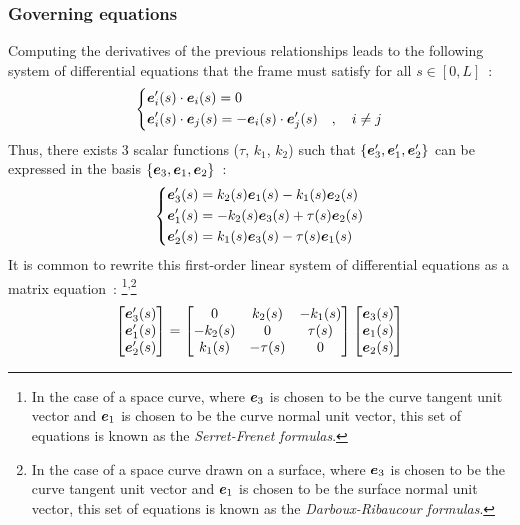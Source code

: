 \subsubsection{Governing equations}
Computing the derivatives of the previous relationships leads to the following system of differential equations that the frame must satisfy for all $s \in [0,L]$~:
\begin{equation}
	\left\{
	\begin{aligned}
		&\boldsymbol{e}'_i(s) \cdot \boldsymbol{e}_i(s) = 0 \\
		&\boldsymbol{e}'_{i}(s) \cdot \boldsymbol{e}_{j}(s) = -\boldsymbol{e}_{i}(s) \cdot \boldsymbol{e}'_{j}(s)\quad , \quad i \neq j
	\end{aligned}
	\right.
\end{equation}
Thus, there exists 3 scalar functions ($\tau$, $k_{1}$, $k_{2}$) such that $\{\boldsymbol{e}'_{3}, \boldsymbol{e}'_{1}, \boldsymbol{e}'_{2}\}$ can be expressed in the basis $\{\boldsymbol{e}_{3}, \boldsymbol{e}_{1}, \boldsymbol{e}_{2}\}$~:
\begin{equation}
	\left\{
	\begin{aligned}
		&\boldsymbol{e}'_{3}(s) = k_{2}(s)\boldsymbol{e}_{1}(s) - k_{1}(s)\boldsymbol{e}_{2}(s) \\
		&\boldsymbol{e}'_{1}(s) = -k_{2}(s)\boldsymbol{e}_{3}(s) + \tau(s)\boldsymbol{e}_{2}(s) \\
		&\boldsymbol{e}'_{2}(s) = k_{1}(s)\boldsymbol{e}_{3}(s) - \tau(s)\boldsymbol{e}_{1}(s)
	\end{aligned}
	\right.
\end{equation}
It is common to rewrite this first-order linear system of differential equations as a matrix equation~: \footnote{In the case of a space curve, where $\boldsymbol{e}_3$ is chosen to be the curve tangent unit vector and $\boldsymbol{e}_1$ is chosen to be the curve normal unit vector, this set of equations is known as the \emph{Serret-Frenet formulas}.}\textsuperscript{,}\footnote{In the case of a space curve drawn on a surface, where $\boldsymbol{e}_3$ is chosen to be the curve tangent unit vector and $\boldsymbol{e}_1$ is chosen to be the surface normal unit vector, this set of equations is known as the \emph{Darboux-Ribaucour formulas}.}
\begin{equation}
	\begin{bmatrix}
		\boldsymbol{e}'_{3}(s) \\
		\boldsymbol{e}'_{1}(s) \\
		\boldsymbol{e}'_{2}(s)
	\end{bmatrix}
	=
	\begin{bmatrix}
		0 & k_{2}(s) & -k_{1}(s) \\
		-k_{2}(s) & 0 & \tau(s) \\
		k_{1}(s) & -\tau(s) & 0
	\end{bmatrix}
	\begin{bmatrix}
		\boldsymbol{e}_{3}(s) \\
		\boldsymbol{e}_{1}(s) \\
		\boldsymbol{e}_{2}(s)
	\end{bmatrix}
\label{eq:movingframe}
\end{equation}
